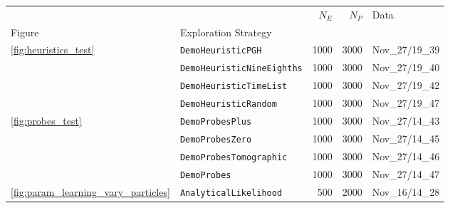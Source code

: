 \begin{tabular}{llrrl}
\hline
                        &                                            &                                    $N_E$ &                                    $N_P$ &                                     Data \\
Figure & Exploration Strategy &                                          &                                          &                                          \\
\midrule
\multirow{4}{*}{\cref{fig:heuristics_test}} & \texttt{DemoHeuristicPGH} &                                     1000 &                                     3000 &                           Nov\_27/19\_39 \\
                        & \texttt{DemoHeuristicNineEighths} &                                     1000 &                                     3000 &                           Nov\_27/19\_40 \\
                        & \texttt{DemoHeuristicTimeList} &                                     1000 &                                     3000 &                           Nov\_27/19\_42 \\
                        & \texttt{DemoHeuristicRandom} &                                     1000 &                                     3000 &                           Nov\_27/19\_47 \\
\cline{1-5}
\multirow{4}{*}{\cref{fig:probes_test}} & \texttt{DemoProbesPlus} &                                     1000 &                                     3000 &                           Nov\_27/14\_43 \\
                        & \texttt{DemoProbesZero} &                                     1000 &                                     3000 &                           Nov\_27/14\_45 \\
                        & \texttt{DemoProbesTomographic} &                                     1000 &                                     3000 &                           Nov\_27/14\_46 \\
                        & \texttt{DemoProbes} &                                     1000 &                                     3000 &                           Nov\_27/14\_47 \\
\cline{1-5}
\cref{fig:param_learning_vary_particles} & \texttt{AnalyticalLikelihood} &                                      500 &                                     2000 &                           Nov\_16/14\_28 \\

\end{tabular}
